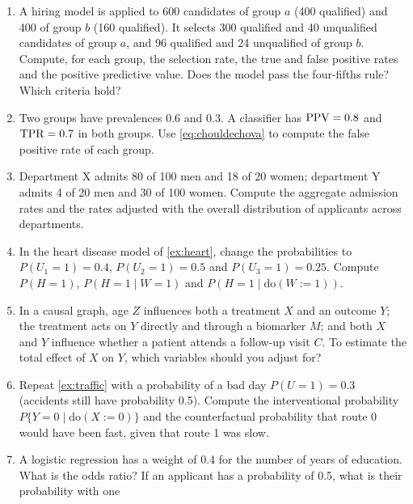 \begin{enumerate}[label=\textbf{3.\arabic*},ref=3.\arabic*,leftmargin=*,itemsep=6pt]
  \item\label{exr3:groups} A hiring model is applied to 600 candidates of group $a$ (400 qualified) and 400
        of group $b$ (160 qualified). It selects 300 qualified and 40 unqualified candidates of group $a$,
        and 96 qualified and 24 unqualified of group $b$. Compute, for each group, the selection rate, the
        true and false positive rates and the positive predictive value. Does the model pass the
        four-fifths rule? Which criteria hold?
  \item\label{exr3:chouldechova} Two groups have prevalences 0.6 and 0.3. A classifier has $\mathrm{PPV}=0.8$ and
        $\mathrm{TPR}=0.7$ in both groups. Use \cref{eq:chouldechova} to compute the false positive rate of each
        group.
  \item\label{exr3:simpson} Department X admits 80 of 100 men and 18 of 20 women; department Y admits 4 of
        20 men and 30 of 100 women. Compute the aggregate admission rates and the rates adjusted with the
        overall distribution of applicants across departments.
  \item\label{exr3:heart} In the heart disease model of \cref{ex:heart}, change the probabilities to
        $P(U_1=1)=0.4$, $P(U_2=1)=0.5$ and $P(U_3=1)=0.25$. Compute $P(H=1)$, $P(H=1\mid W=1)$ and
        $P(H=1\mid\mathrm{do}(W:=1))$.
  \item\label{exr3:adjust} In a causal graph, age $Z$ influences both a treatment $X$ and an outcome $Y$; the
        treatment acts on $Y$ directly and through a biomarker $M$; and both $X$ and $Y$ influence whether a
        patient attends a follow-up visit $C$. To estimate the total effect of $X$ on $Y$, which variables
        should you adjust for?
  \item\label{exr3:traffic} Repeat \cref{ex:traffic} with a probability of a bad day $P(U=1)=0.3$ (accidents
        still have probability 0.5). Compute the interventional probability $P\{Y=0\mid\mathrm{do}(X:=0)\}$
        and the counterfactual probability that route 0 would have been fast, given that route 1 was
        slow.
  \item\label{exr3:odds} A logistic regression has a weight of 0.4 for the number of years of education.
        What is the odds ratio? If an applicant has a probability of 0.5, what is their probability with one

\end{enumerate}
